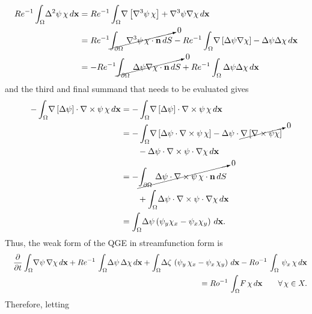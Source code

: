 \begin{align*}
  Re^{-1}\int_{\Omega}\! \Delta^2 \psi\, \chi \, d\mathbf{x} &= Re^{-1}\int_{\Omega}\! \nabla\left[
    \nabla^3 \psi \, \chi \right] + \nabla^3 \psi \nabla \chi \, d\mathbf{x} \\
  &= Re^{-1}\cancelto{0}{\int_{\partial\Omega}\, \nabla^3 \psi\, \chi\cdot \mathbf{n}
    \, dS} - Re^{-1}\int_{\Omega}\! \nabla\left[ \Delta\psi \nabla \chi \right] - \Delta
    \psi \Delta \chi \, d\mathbf{x} \\
  &= -Re^{-1} \cancelto{0}{\int_{\partial\Omega}\, \Delta\psi \nabla \chi \cdot
    \mathbf{n}\, dS} + Re^{-1} \int_{\Omega} \Delta \psi \Delta \chi \, d\mathbf{x}
\end{align*}
and the third and final summand that needs to be evaluated gives
\begin{align*}
  -\int_{\Omega}\! \nabla\left[ \Delta\psi\right]\cdot
    \nabla\times\psi \, \chi \, d\mathbf{x} &= -\int_{\Omega}\!
    \nabla\left[\Delta\psi\right]\cdot \nabla\times\psi \, \chi\, d\mathbf{x}\\
  &= -\int_{\Omega}\! \nabla\left[ \Delta\psi \cdot \nabla\times\psi\, \chi
    \right] -\Delta\psi\cdot \cancelto{0}{\nabla\left[ \nabla\times\psi \chi
    \right]} \\
      &\qquad - \Delta\psi\cdot \nabla\times\psi \cdot \nabla\chi \, d\mathbf{x} \\
  &= -\cancelto{0}{\int_{\partial\Omega}\, \Delta\psi \cdot \nabla\times\psi\, \chi
    \cdot \mathbf{n} \, dS} \\
    &\qquad + \int_{\Omega}\! \Delta \psi \cdot \nabla\times \psi \cdot
      \nabla \chi \, d\mathbf{x} \\
  &= \int_{\Omega}\! \Delta\psi\left( \psi_y\chi_x - \psi_x\chi_y \right)\, d\mathbf{x}.
\end{align*}
Thus, the weak form of the QGE in streamfunction form is
\begin{eqnarray}
  && \frac{\partial}{\partial t} \int_{\Omega}\! \nabla \psi\, \nabla \chi  \, d\mathbf{x}
    + Re^{-1} \, \int_{\Omega}\! \Delta \psi \, \Delta \chi \, d{\bf x} + \int_{\Omega}\! \Delta
    \zeta \, \left( \psi_y \, \chi_x - \psi_x \, \chi_y \right)\, d{\bf x} - Ro^{-1} \, \int_{\Omega}
    \, \psi_x \, \chi \, d{\bf x} \nonumber \\
  && \hspace*{3.0cm} = Ro^{-1}\, \int_{\Omega}\! F \, \chi \, d{\bf x} \qquad \forall \, \chi \in X .
\label{eqn:qge_psi_weak}
\end{eqnarray}
Therefore, letting
